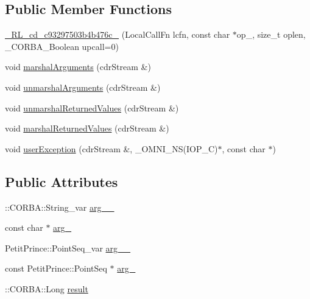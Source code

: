 \subsection*{Public Member Functions}
\begin{DoxyCompactItemize}
\item 
\hyperlink{class__0_r_l__cd__c93297503b4b476c__51000000_a6f7e0eae6f7801b77639a1abe8eb6b3c}{\+\_\+R\+L\+\_\+cd\+\_\+c93297503b4b476c\+\_} (Local\+Call\+Fn lcfn, const char $\ast$op\+\_\+, size\+\_\+t oplen, \+\_\+\+C\+O\+R\+B\+A\+\_\+\+Boolean upcall=0)
\item 
void \hyperlink{class__0_r_l__cd__c93297503b4b476c__51000000_adba2397575a650482c38d6373ef541bc}{marshal\+Arguments} (cdr\+Stream \&)
\item 
void \hyperlink{class__0_r_l__cd__c93297503b4b476c__51000000_ad28d04aa3e04b0339dfd32d5fc018071}{unmarshal\+Arguments} (cdr\+Stream \&)
\item 
void \hyperlink{class__0_r_l__cd__c93297503b4b476c__51000000_ad8ebd81f2bcb26aca9398a4c2f127430}{unmarshal\+Returned\+Values} (cdr\+Stream \&)
\item 
void \hyperlink{class__0_r_l__cd__c93297503b4b476c__51000000_ae44ad06ddf14be024d787efb55abb721}{marshal\+Returned\+Values} (cdr\+Stream \&)
\item 
void \hyperlink{class__0_r_l__cd__c93297503b4b476c__51000000_acd2879e7cb098e9b6d8d308f0dbe93d8}{user\+Exception} (cdr\+Stream \&, \+\_\+\+O\+M\+N\+I\+\_\+\+NS(I\+O\+P\+\_\+C)$\ast$, const char $\ast$)
\end{DoxyCompactItemize}
\subsection*{Public Attributes}
\begin{DoxyCompactItemize}
\item 
\+::C\+O\+R\+B\+A\+::\+String\+\_\+var \hyperlink{class__0_r_l__cd__c93297503b4b476c__51000000_ad86d0df67a8dfd4a7b88a247aebbfe67}{arg\+\_\+\_\+}
\item 
const char $\ast$ \hyperlink{class__0_r_l__cd__c93297503b4b476c__51000000_a81e981035dd946f135928f6dbca1567f}{arg\+\_}
\item 
Petit\+Prince\+::\+Point\+Seq\+\_\+var \hyperlink{class__0_r_l__cd__c93297503b4b476c__51000000_a20400a7189ab950f2440a9eff1293092}{arg\+\_\+\_\+}
\item 
const Petit\+Prince\+::\+Point\+Seq $\ast$ \hyperlink{class__0_r_l__cd__c93297503b4b476c__51000000_a7a12cf2b92afccb92f38ae00be0d91d8}{arg\+\_}
\item 
\+::C\+O\+R\+B\+A\+::\+Long \hyperlink{class__0_r_l__cd__c93297503b4b476c__51000000_a670d0d3e4c907d3c2a1e627ed061c956}{result}
\end{DoxyCompactItemize}
